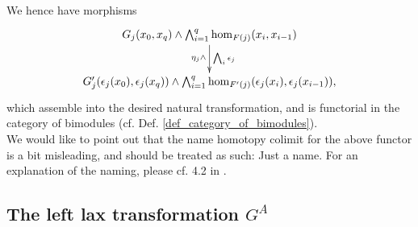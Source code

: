 \begin{defn}
      We hence have morphisms
      \begin{displaymath}
        \xymatrix{
          G_j(x_0,x_q) \wedge \bigwedge_{i=1}^q \hom_{F(j)}(x_i,x_{i-1}) %
            \ar[d]_{\eta_j \wedge}^{\bigwedge_i \epsilon_j}
          \\
          G_j^\prime(\epsilon_j(x_0),\epsilon_j(x_q)) \wedge %
            \bigwedge_{i=1}^q \hom_{F^\prime(j)}(\epsilon_j(x_i),\epsilon_j(x_{i-1})),  
        }
      \end{displaymath}
      which assemble into the desired natural transformation, and is functorial in the category of bimodules (cf. Def. \ref{def_category_of_bimodules}).\\
      We would like to point out that the name homotopy colimit for the above functor is a bit misleading, and should be treated as such: Just a name. 
      For an explanation of the naming, please cf. 4.2 in \cite{brun2010covering}.
    \end{defn}

  \subsection{The left lax transformation $G^A$}

